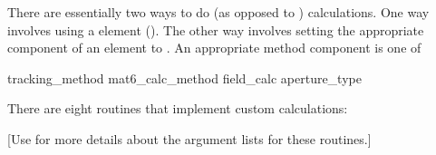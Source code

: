 There are essentially two ways to do  (as opposed to ) calculations. One way
involves using a  element (). The other way involves setting the
appropriate  component of an element to . An appropriate method component is
one of
\begin{example}
  tracking_method       
  mat6_calc_method      
  field_calc            
  aperture_type         
\end{example}

There are eight routines that implement custom calculations:
\begin{example}
\end{example}
[Use  for more details about the argument lists for these
routines.]  

